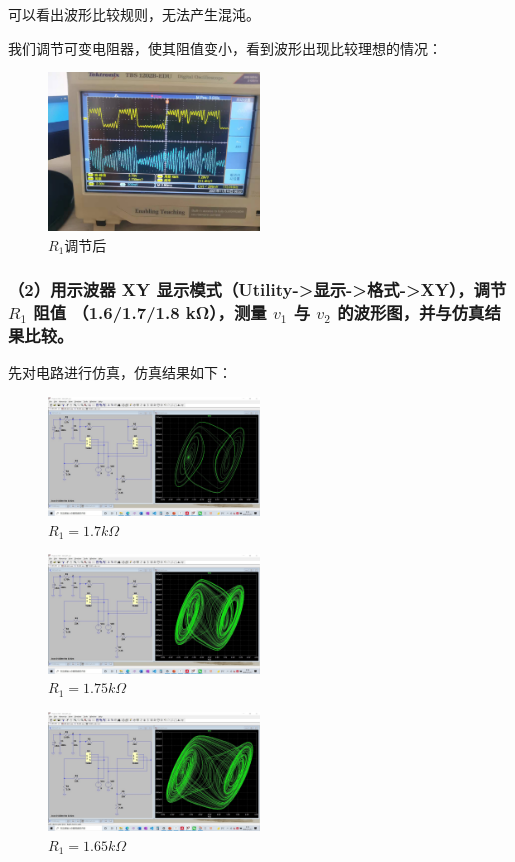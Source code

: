 \documentclass[UTF8]{ctexart}
\begin{document}
可以看出波形比较规则，无法产生混沌。

我们调节可变电阻器，使其阻值变小，看到波形出现比较理想的情况：

\begin{figure}[H]
        \centering
        \includegraphics*[width = 0.5\textwidth]{1-1-adjust-r.jpg}
        \caption{$R_1$调节后}
\end{figure}


\subsubsection*{（2）用示波器 XY 显示模式（Utility->显示->格式->XY），调节 $R_1$ 阻值
（1.6/1.7/1.8 kΩ），测量 $v_1$ 与 $v_2$ 的波形图，并与仿真结果比较。}

先对电路进行仿真，仿真结果如下：
\begin{figure}[H]
        \centering
        \includegraphics*[width = 0.5\textwidth]{1-2-1.7k.jpg}
        \caption{$R_1 = 1.7k\Omega$}
\end{figure}
\begin{figure}[H]
        \centering
        \includegraphics*[width = 0.5\textwidth]{1-2-1.75k.jpg}
        \caption{$R_1 = 1.75k\Omega$}
\end{figure}
\begin{figure}[H]
        \centering
        \includegraphics*[width = 0.5\textwidth]{1-2-1.65k.jpg}
        \caption{$R_1 = 1.65k\Omega$}
\end{figure}
\end{document}
